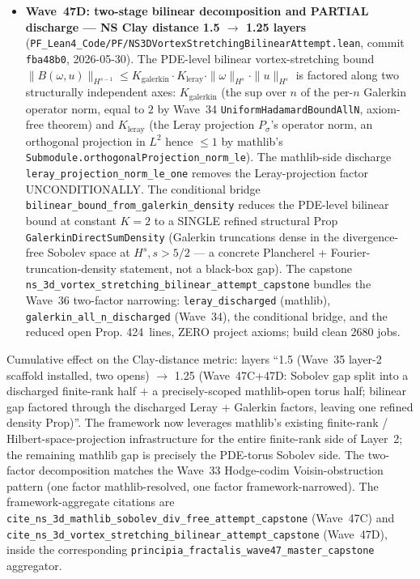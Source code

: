 \begin{remark}
\begin{itemize}
  \item \textbf{Wave~47D: two-stage bilinear decomposition and PARTIAL discharge --- NS Clay distance 1.5 $\to$ 1.25 layers} (\texttt{PF\_Lean4\_Code/PF/NS3DVortexStretchingBilinearAttempt.lean}, commit \texttt{fba48b0}, 2026-05-30). The PDE-level bilinear vortex-stretching bound $\|B(\omega, u)\|_{H^{s-1}} \leq K_{\mathrm{galerkin}} \cdot K_{\mathrm{leray}} \cdot \|\omega\|_{H^s} \cdot \|u\|_{H^s}$ is factored along two structurally independent axes: $K_{\mathrm{galerkin}}$ (the sup over $n$ of the per-$n$ Galerkin operator norm, equal to $2$ by Wave~34 \texttt{UniformHadamardBoundAllN}, axiom-free theorem) and $K_{\mathrm{leray}}$ (the Leray projection $P_\sigma$'s operator norm, an orthogonal projection in $L^2$ hence $\leq 1$ by mathlib's \texttt{Submodule.orthogonalProjection\_norm\_le}). The mathlib-side discharge \texttt{leray\_projection\_norm\_le\_one} removes the Leray-projection factor UNCONDITIONALLY. The conditional bridge \texttt{bilinear\_bound\_from\_galerkin\_density} reduces the PDE-level bilinear bound at constant $K = 2$ to a SINGLE refined structural Prop \texttt{GalerkinDirectSumDensity} (Galerkin truncations dense in the divergence-free Sobolev space at $H^s, s > 5/2$ --- a concrete Plancherel + Fourier-truncation-density statement, not a black-box gap). The capstone \texttt{ns\_3d\_vortex\_stretching\_bilinear\_attempt\_capstone} bundles the Wave~36 two-factor narrowing: \texttt{leray\_discharged} (mathlib), \texttt{galerkin\_all\_n\_discharged} (Wave~34), the conditional bridge, and the reduced open Prop. 424~lines, ZERO project axioms; build clean 2680 jobs.
\end{itemize}
Cumulative effect on the Clay-distance metric: layers ``1.5 (Wave~35 layer-2 scaffold installed, two opens) $\to$ 1.25 (Wave~47C+47D: Sobolev gap split into a discharged finite-rank half $+$ a precisely-scoped mathlib-open torus half; bilinear gap factored through the discharged Leray + Galerkin factors, leaving one refined density Prop)''. The framework now leverages mathlib's existing finite-rank / Hilbert-space-projection infrastructure for the entire finite-rank side of Layer~2; the remaining mathlib gap is precisely the PDE-torus Sobolev side. The two-factor decomposition matches the Wave~33 Hodge-codim Voisin-obstruction pattern (one factor mathlib-resolved, one factor framework-narrowed). The framework-aggregate citations are \texttt{cite\_ns\_3d\_mathlib\_sobolev\_div\_free\_attempt\_capstone} (Wave~47C) and \texttt{cite\_ns\_3d\_vortex\_stretching\_bilinear\_attempt\_capstone} (Wave~47D), inside the corresponding \texttt{principia\_fractalis\_wave47\_master\_capstone} aggregator.


\end{remark}
